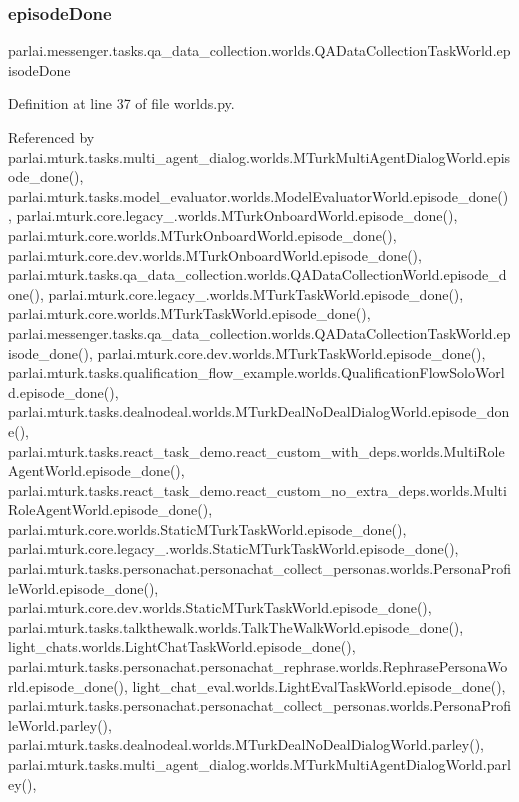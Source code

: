 \subsubsection{\texorpdfstring{episode\+Done}{episodeDone}}
{\footnotesize\ttfamily parlai.\+messenger.\+tasks.\+qa\+\_\+data\+\_\+collection.\+worlds.\+Q\+A\+Data\+Collection\+Task\+World.\+episode\+Done}



Definition at line 37 of file worlds.\+py.



Referenced by parlai.\+mturk.\+tasks.\+multi\+\_\+agent\+\_\+dialog.\+worlds.\+M\+Turk\+Multi\+Agent\+Dialog\+World.\+episode\+\_\+done(), parlai.\+mturk.\+tasks.\+model\+\_\+evaluator.\+worlds.\+Model\+Evaluator\+World.\+episode\+\_\+done(), parlai.\+mturk.\+core.\+legacy\+\_.\+worlds.\+M\+Turk\+Onboard\+World.\+episode\+\_\+done(), parlai.\+mturk.\+core.\+worlds.\+M\+Turk\+Onboard\+World.\+episode\+\_\+done(), parlai.\+mturk.\+core.\+dev.\+worlds.\+M\+Turk\+Onboard\+World.\+episode\+\_\+done(), parlai.\+mturk.\+tasks.\+qa\+\_\+data\+\_\+collection.\+worlds.\+Q\+A\+Data\+Collection\+World.\+episode\+\_\+done(), parlai.\+mturk.\+core.\+legacy\+\_.\+worlds.\+M\+Turk\+Task\+World.\+episode\+\_\+done(), parlai.\+mturk.\+core.\+worlds.\+M\+Turk\+Task\+World.\+episode\+\_\+done(), parlai.\+messenger.\+tasks.\+qa\+\_\+data\+\_\+collection.\+worlds.\+Q\+A\+Data\+Collection\+Task\+World.\+episode\+\_\+done(), parlai.\+mturk.\+core.\+dev.\+worlds.\+M\+Turk\+Task\+World.\+episode\+\_\+done(), parlai.\+mturk.\+tasks.\+qualification\+\_\+flow\+\_\+example.\+worlds.\+Qualification\+Flow\+Solo\+World.\+episode\+\_\+done(), parlai.\+mturk.\+tasks.\+dealnodeal.\+worlds.\+M\+Turk\+Deal\+No\+Deal\+Dialog\+World.\+episode\+\_\+done(), parlai.\+mturk.\+tasks.\+react\+\_\+task\+\_\+demo.\+react\+\_\+custom\+\_\+with\+\_\+deps.\+worlds.\+Multi\+Role\+Agent\+World.\+episode\+\_\+done(), parlai.\+mturk.\+tasks.\+react\+\_\+task\+\_\+demo.\+react\+\_\+custom\+\_\+no\+\_\+extra\+\_\+deps.\+worlds.\+Multi\+Role\+Agent\+World.\+episode\+\_\+done(), parlai.\+mturk.\+core.\+worlds.\+Static\+M\+Turk\+Task\+World.\+episode\+\_\+done(), parlai.\+mturk.\+core.\+legacy\+\_.\+worlds.\+Static\+M\+Turk\+Task\+World.\+episode\+\_\+done(), parlai.\+mturk.\+tasks.\+personachat.\+personachat\+\_\+collect\+\_\+personas.\+worlds.\+Persona\+Profile\+World.\+episode\+\_\+done(), parlai.\+mturk.\+core.\+dev.\+worlds.\+Static\+M\+Turk\+Task\+World.\+episode\+\_\+done(), parlai.\+mturk.\+tasks.\+talkthewalk.\+worlds.\+Talk\+The\+Walk\+World.\+episode\+\_\+done(), light\+\_\+chats.\+worlds.\+Light\+Chat\+Task\+World.\+episode\+\_\+done(), parlai.\+mturk.\+tasks.\+personachat.\+personachat\+\_\+rephrase.\+worlds.\+Rephrase\+Persona\+World.\+episode\+\_\+done(), light\+\_\+chat\+\_\+eval.\+worlds.\+Light\+Eval\+Task\+World.\+episode\+\_\+done(), parlai.\+mturk.\+tasks.\+personachat.\+personachat\+\_\+collect\+\_\+personas.\+worlds.\+Persona\+Profile\+World.\+parley(), parlai.\+mturk.\+tasks.\+dealnodeal.\+worlds.\+M\+Turk\+Deal\+No\+Deal\+Dialog\+World.\+parley(), parlai.\+mturk.\+tasks.\+multi\+\_\+agent\+\_\+dialog.\+worlds.\+M\+Turk\+Multi\+Agent\+Dialog\+World.\+parley(), 